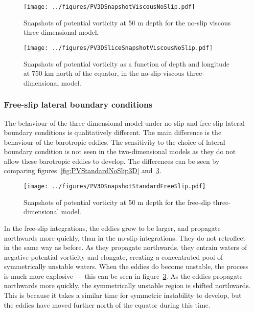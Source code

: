 \begin{figure}[p]
    \centering
    \texttt{[image: ../figures/PV3DSnapshotViscousNoSlip.pdf]}
    \caption{Snapshots of potential vorticity at 50 m depth for the no-slip viscous three-dimensional model.}
    \label{fig:PV3DSnapshotViscousNoSlip}
\end{figure}

\begin{figure}[t]
    \centering
    \texttt{[image: ../figures/PV3DSliceSnapshotViscousNoSlip.pdf]}
    \caption{Snapshots of potential vorticity as a function of depth and longitude at 750 km north of the equator, in the no-slip viscous three-dimensional model.}
    \label{fig:PVatFixedLatForViscous3D}
\end{figure}

\subsubsection{Free-slip lateral boundary conditions}
The behaviour of the three-dimensional model under no-slip and free-slip lateral boundary conditions is qualitatively different. The main difference is the behaviour of the barotropic eddies. The sensitivity to the choice of lateral boundary condition is not seen in the two-dimensional models as they do not allow these barotropic eddies to develop. The differences can be seen by comparing figures~\ref{fig:PVStandardNoSlip3D} and~\ref{fig:PV3DSnapshotStandardFreeSlip}.

\begin{figure}[p]
    \centering
    \texttt{[image: ../figures/PV3DSnapshotStandardFreeSlip.pdf]}
    \caption{Snapshots of potential vorticity at 50 m depth for the free-slip three-dimensional model.}
    \label{fig:PV3DSnapshotStandardFreeSlip}
\end{figure}

In the free-slip integrations, the eddies grow to be larger, and propagate northwards more quickly, than in the no-slip integrations. They do not retroflect in the same way as before. As they propagate northwards, they entrain waters of negative potential vorticity and elongate, creating a concentrated pool of symmetrically unstable waters. When the eddies do become unstable, the process is much more explosive --- this can be seen in figure~\ref{fig:PV3DSnapshotStandardFreeSlip}. As the eddies propagate northwards more quickly, the symmetrically unstable region is shifted northwards. This is because it takes a similar time for symmetric instability to develop, but the eddies have moved further north of the equator during this time.

